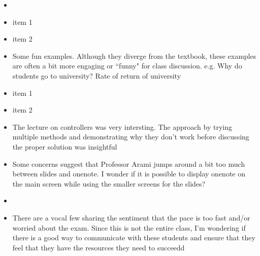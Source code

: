 

    \begin{itemize}
        \item 
    \end{itemize}
    \begin{itemize}
        \item item 1
        \item item 2
    \end{itemize}




    \begin{itemize}
        \item Some fun examples. Although they diverge from the textbook, these examples are often a bit more engaging or ``funny" for class discussion. e.g. Why do students go to university? Rate of return of university
    \end{itemize}
    \begin{itemize}
        \item item 1
        \item item 2
    \end{itemize}



    \begin{itemize}
        \item The lecture on controllers was very intersting. The approach by trying multiple methods and demonstrating why they don't work before discussing the proper solution was insightful
    \end{itemize}
    \begin{itemize}
        \item Some concerns suggest that Professor Arami jumps around a bit too much between slides and onenote. I wonder if it is possible to display onenote on the main screen while using the smaller screens for the slides?
        \item 
        \item There are a vocal few sharing the sentiment that the pace is too fast and/or worried about the exam. Since this is not the entire class, I'm wondering if there is a good way to communicate with these students and ensure that they feel that they have the resources they need to succeedd
    \end{itemize}

